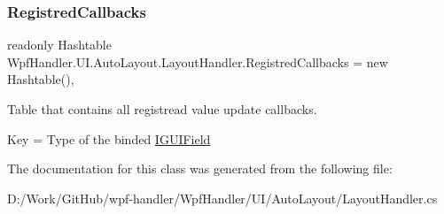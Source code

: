 \subsubsection{\texorpdfstring{Registred\+Callbacks}{RegistredCallbacks}}
{\footnotesize\ttfamily readonly Hashtable Wpf\+Handler.\+U\+I.\+Auto\+Layout.\+Layout\+Handler.\+Registred\+Callbacks = new Hashtable()\hspace{0.3cm}{\ttfamily [static]}, {\ttfamily [private]}}



Table that contains all registread value update callbacks. 

Key = Type of the binded \mbox{\hyperlink{interface_wpf_handler_1_1_u_i_1_1_auto_layout_1_1_i_g_u_i_field}{I\+G\+U\+I\+Field}} 

The documentation for this class was generated from the following file\+:\begin{DoxyCompactItemize}
\item 
D\+:/\+Work/\+Git\+Hub/wpf-\/handler/\+Wpf\+Handler/\+U\+I/\+Auto\+Layout/Layout\+Handler.\+cs\end{DoxyCompactItemize}
